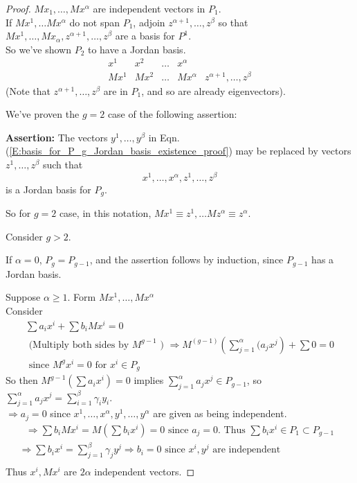 \documentclass[twoside]{amsart}
\theoremstyle{plain}
\theoremstyle{definition}
\begin{document}
\begin{proof}
$Mx_1, \dots , Mx^{\alpha}$ are independent vectors in $P_1$.  \\
\phantom{ If } If $Mx^1, \dots Mx^{\alpha}$ do not span $P_1$, adjoin $z^{\alpha+1}, \dots , z^{\beta}$ so that $Mx^1, \dots, Mx_{\alpha}, z^{\alpha+1}, \dots , z^{\beta}$ are a basis for $P^1$.  \\
\phantom{ If If} So we've shown $P_2$ to have a Jordan basis.  
\[
\begin{matrix}
x^1 & x^2 & \dots & x^{\alpha} & \quad \\
Mx^1 & Mx^2 & \dots & Mx^{\alpha} & z^{\alpha+1}, \dots , z^{\beta}
\end{matrix}
\]
(Note that $z^{\alpha+1}, \dots , z^{\beta}$ are in $P_1$, and so are already eigenvectors).  

We've proven the $g=2$ case of the following assertion:

\textbf{ Assertion:} The vectors $y^1, \dots , y^{\beta}$ in Eqn. (\ref{E:basis_for_P_g_Jordan_basis_existence_proof}) may be replaced by vectors $z^1, \dots , z^{\beta}$ such that 
\[
x^1, \dots , x^{\alpha}, z^1, \dots , z^{\beta}
\]
is a Jordan basis for $P_g$.

So for $g=2$ case, in this notation, $Mx^1 \equiv z^1, \dots Mz^{\alpha} \equiv z^{\alpha}$.  

Consider $g>2$.  

If $\alpha =0$, $P_g = P_{g-1}$, and the assertion follows by induction, since $P_{g-1}$ has a Jordan basis.  

Suppose $\alpha \geq 1$.  Form $Mx^1, \dots, Mx^{\alpha}$ \\
Consider 
\begin{gather*}
  \sum a_i x^i + \sum b_i M x^i = 0  \\
  \text{ (Multiply both sides by $M^{g-1}$ ) } \Longrightarrow M^{(g-1)} \left( \sum_{j=1}^{\alpha} (a_j x^j \right) + \sum 0 = 0 \\
  \text{ since } M^g x^i = 0 \text{ for } x^i \in P_g
\end{gather*}
So then $M^{g-1} ( \sum a_i x^i ) =0 $ implies $\sum_{j=1}^{\alpha} a_j x^j \in P_{g-1}$, so $\sum_{j=1}^{\alpha} a_j x^j = \sum_{i=1}^{\beta} \gamma_i y_i$.  \\
\phantom{So} $\Longrightarrow a_j =0 $ since $x^1, \dots , x^{\alpha}, y^1 , \dots , y^{\alpha}$ are given as being independent.  \bigskip \\
\[
\begin{gathered}
  \text{ $\Longrightarrow \sum b_i Mx^i = M(\sum b_i x^i ) = 0 $ since $a_j=0$.  Thus $\sum b_i x^i \in P_1 \subset P_{g-1} $ } \\
  \Longrightarrow \sum b_i x^i = \sum_{j=1}^{\beta} \gamma_j y^j \Longrightarrow b_i = 0 \text{ since $x^i, y^j$ are independent } \\
\end{gathered}
\]
Thus $x^i, Mx^i $ are $2 \alpha$ independent vectors.  


\end{proof}
\end{document}
